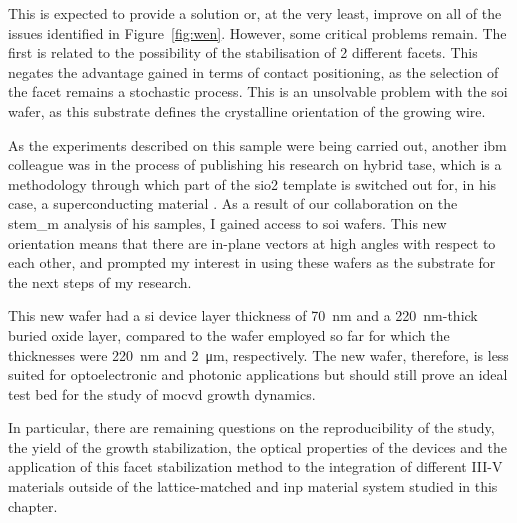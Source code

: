 This is expected to provide a solution or, at the very least, improve on all of the issues identified in Figure~\ref{fig:wen}. However, some critical problems remain. The first is related to the possibility of the stabilisation of 2 different  facets. This negates the advantage gained in terms of contact positioning, as the selection of the  facet remains a stochastic process. This is an unsolvable problem with the \hkl[0 0 1] \acs{soi} wafer, as this substrate defines the crystalline orientation of the growing wire. 

As the experiments described on this sample were being carried out, another \acs{ibm} colleague was in the process of publishing his research on hybrid \acs{tase}, which is a methodology through which part of the \acs{sio2} template is switched out for, in his case, a superconducting material \cite{Ritter2021}. As a result of our collaboration on the \acs{stem_m} analysis of his samples, I gained access to \hkl[1 1 0] \acs{soi} wafers. This new orientation means that there are in-plane  vectors at high angles with respect to each other, and prompted my interest in using these wafers as the substrate for the next steps of my research.

This new wafer had a \acs{si} device layer thickness of \qty{70}{\nano\metre} and a \qty{220}{\nano\metre}-thick buried oxide layer, compared to the \hkl[0 0 1] wafer employed so far for which the thicknesses were \qty{220}{\nano\metre} and \qty{2}{\micro\metre}, respectively. The new wafer, therefore, is less suited for optoelectronic and photonic applications but should still prove an ideal test bed for the study of \acs{mocvd} growth dynamics.

In particular, there are remaining questions on the reproducibility of the study, the yield of the growth stabilization, the optical properties of the devices and the application of this facet stabilization method to the integration of different III-V materials outside of the lattice-matched  and \acs{inp} material system studied in this chapter.










